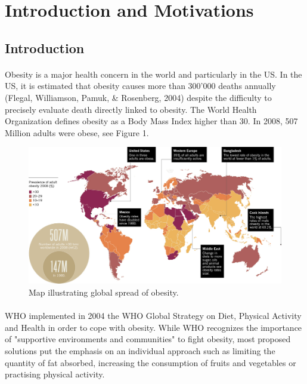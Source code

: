 \documentclass[11pt]{article}
\begin{document}
\section{Introduction and Motivations}

\subsection{Introduction}
\paragraph{}
Obesity is a major health concern in the world and particularly in the US. In the US, it is estimated that obesity causes more than 300'000 deaths annually (Flegal, Williamson, Pamuk, \& Rosenberg, 2004) despite the difficulty to precisely evaluate death directly linked to obesity. The World Health Organization defines obesity as a Body Mass Index higher than 30. In 2008, 507 Million adults were obese, see Figure 1.
\begin{figure}[!h]
\center
   \includegraphics[width=\textwidth,keepaspectratio]{Nature_p50_Global_spread_of_obesity.png}
   \caption{\label{4} Map illustrating global spread of obesity.}
\end{figure}
\paragraph{}
WHO implemented in 2004 the WHO Global Strategy on Diet, Physical Activity and Health in order to cope with obesity. While WHO recognizes the importance of "supportive environments and communities" to fight obesity, most proposed solutions put the emphasis on an individual approach such as limiting the quantity of fat absorbed, increasing the consumption of fruits and vegetables or practising physical activity. 
\end{document}
